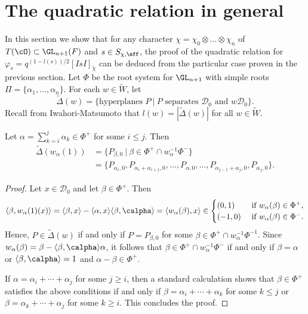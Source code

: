 \section{The quadratic relation in general}

    In this section we show that for any character $\chi=\chi_0\otimes\ldots\otimes\chi_n$ of $T(\cO)\subset\GL_{n+1}(F)$ and $s\in S_{\chi,\aff}$, the proof of the quadratic relation for $\varphi_s=q^{(1-l(s))/2}[IsI]_{\check{\chi}}$ can be deduced from the particular case proven in the previous section. Let $\Phi$ be the root system for $\GL_{n+1}$ with simple roots $\Pi=\{\alpha_1,\ldots,\alpha_n\}$. For each $w\in\tilde{W}$, let 
    $$\widetilde{\Delta}(w)=\{\text{hyperplanes }P\ |\ P\text{ separates }\mathcal{D}_0\text{ and }w\mathcal{D}_0\}.$$
    Recall from Iwahori-Matsumoto that $l(w)=|\widetilde{\Delta}(w)|$ for all $w\in\tilde{W}$.

    \begin{lemma}\label{lem_w1}
        Let $\alpha=\sum_{k=i}^{j}\alpha_k\in\Phi^+$ for some $i\leq j$. Then
        \begin{align*}
            \widetilde{\Delta}(w_\alpha(1))&=\{P_{\beta,0}\ |\ \beta\in\Phi^+\cap w_\alpha^{-1}\Phi^-\}\\
            &=\{P_{\alpha_i,0},P_{\alpha_i+\alpha_{i+1},0},\ldots,P_{\alpha,0},\ldots,P_{\alpha_{j-1}+\alpha_j,0},P_{\alpha_j,0}\}.
        \end{align*}
    \end{lemma}

    \begin{proof}
        Let $x\in\mathcal{D}_0$ and let $\beta\in\Phi^+$. Then
        \begin{equation*}
            \langle\beta,w_\alpha(1)(x)\rangle=\langle\beta,x\rangle-\langle\alpha,x\rangle\langle\beta,\calpha\rangle=\langle w_\alpha(\beta),x\rangle\in
            \begin{cases}
                (0,1) &\text{ if } w_\alpha(\beta)\in\Phi^+,\\
                (-1,0) &\text{ if } w_\alpha(\beta)\in\Phi^-.
            \end{cases}
        \end{equation*}
        Hence, $P\in\widetilde{\Delta}(w)$ if and only if $P=P_{\beta,0}$ for some $\beta\in\Phi^+\cap w_\alpha^{-1}\Phi^{-1}$. Since $w_\alpha(\beta)=\beta-\langle\beta,\calpha\rangle\alpha$, it follows that $\beta\in\Phi^+\cap w_\alpha^{-1}\Phi^-$ if and only if $\beta=\alpha$ or $\langle\beta,\calpha\rangle=1$ and $\alpha-\beta\in\Phi^+$.
        
        If $\alpha=\alpha_i+\cdots+\alpha_j$ for some $j\geq i$, then a standard calculation shows that $\beta\in\Phi^+$ satisfies the above conditions if and only if $\beta=\alpha_i+\cdots+\alpha_k$ for some $k\leq j$ or $\beta=\alpha_k+\cdots+\alpha_j$ for some $k\geq i$. This concludes the proof.
    \end{proof}

